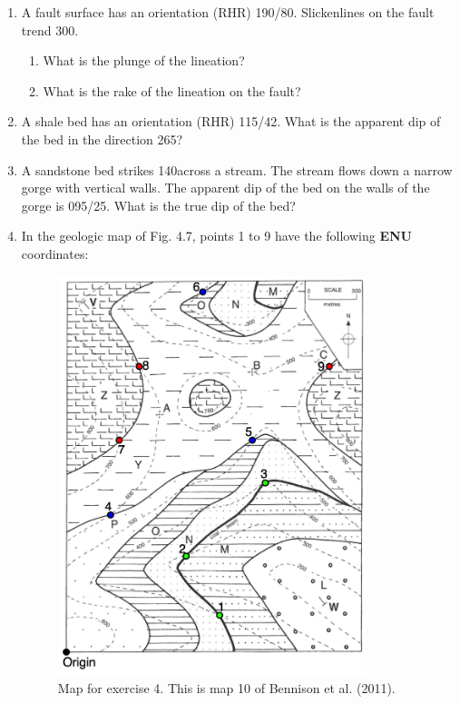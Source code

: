 \documentclass[a4paper , 12pt]{book}
\begin{document}
\begin{enumerate}
    
    \item A fault surface has an orientation (RHR) 190/80. Slickenlines on the fault trend 300\degree. 
    \begin{enumerate}
        \item What is the plunge of the lineation?
        \item What is the rake of the lineation on the fault?
    \end{enumerate}
    
    \item A shale bed has an orientation (RHR) 115/42. What is the apparent dip of the bed in the direction 265\degree?
    
    \item A sandstone bed strikes 140\degree across a stream. The stream flows down a narrow gorge with vertical walls. The apparent dip of the bed on the walls of the gorge is 095/25. What is the true dip of the bed?
    
    \item In the geologic map of Fig. 4.7, points 1 to 9 have the following \textbf{ENU} coordinates:
    
    \begin{figure}[ht]
    \centering
    \includegraphics[width=9cm]{Figures/ch4f8.png}
    \caption{Map for exercise 4. This is map 10 of Bennison et al. (2011).}
    \end{figure}
    

\end{enumerate}
\end{document}
